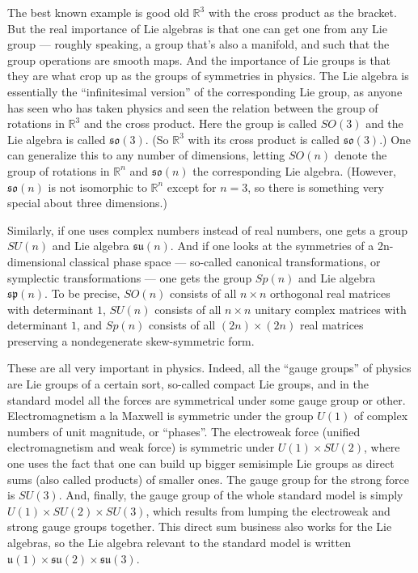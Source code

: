 \documentclass{article}
\begin{document}
The best known example is good old \(\mathbb{R}^3\) with the cross
product as the bracket. But the real importance of Lie algebras is that
one can get one from any Lie group --- roughly speaking, a group that's
also a manifold, and such that the group operations are smooth maps. And
the importance of Lie groups is that they are what crop up as the groups
of symmetries in physics. The Lie algebra is essentially the
``infinitesimal version'' of the corresponding Lie group, as anyone has
seen who has taken physics and seen the relation between the group of
rotations in \(\mathbb{R}^3\) and the cross product. Here the group is
called \(SO(3)\) and the Lie algebra is called \(\mathfrak{so}(3)\). (So
\(\mathbb{R}^3\) with its cross product is called \(\mathfrak{so}(3)\).)
One can generalize this to any number of dimensions, letting \(SO(n)\)
denote the group of rotations in \(\mathbb{R}^n\) and
\(\mathfrak{so}(n)\) the corresponding Lie algebra. (However,
\(\mathfrak{so}(n)\) is not isomorphic to \(\mathbb{R}^n\) except for
\(n = 3\), so there is something very special about three dimensions.)

Similarly, if one uses complex numbers instead of real numbers, one gets
a group \(SU(n)\) and Lie algebra \(\mathfrak{su}(n)\). And if one looks
at the symmetries of a 2n-dimensional classical phase space ---
so-called canonical transformations, or symplectic transformations ---
one gets the group \(Sp(n)\) and Lie algebra \(\mathfrak{sp}(n)\). To be
precise, \(SO(n)\) consists of all \(n\times n\) orthogonal real
matrices with determinant \(1\), \(SU(n)\) consists of all \(n\times n\)
unitary complex matrices with determinant \(1\), and \(Sp(n)\) consists
of all \((2n)\times(2n)\) real matrices preserving a nondegenerate
skew-symmetric form.

These are all very important in physics. Indeed, all the ``gauge
groups'' of physics are Lie groups of a certain sort, so-called compact
Lie groups, and in the standard model all the forces are symmetrical
under some gauge group or other. Electromagnetism a la Maxwell is
symmetric under the group \(U(1)\) of complex numbers of unit magnitude,
or ``phases''. The electroweak force (unified electromagnetism and weak
force) is symmetric under \(U(1) \times SU(2)\), where one uses the fact
that one can build up bigger semisimple Lie groups as direct sums (also
called products) of smaller ones. The gauge group for the strong force
is \(SU(3)\). And, finally, the gauge group of the whole standard model
is simply \(U(1) \times SU(2) \times SU(3)\), which results from lumping
the electroweak and strong gauge groups together. This direct sum
business also works for the Lie algebras, so the Lie algebra relevant to
the standard model is written
\(\mathfrak{u}(1) \times \mathfrak{su}(2) \times \mathfrak{su}(3)\).
\end{document}
